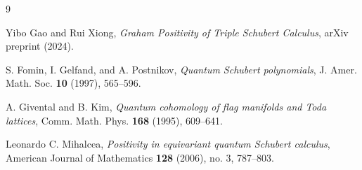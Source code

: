 \documentclass{amsart}
\theoremstyle{definition}
\begin{document}
\begin{thebibliography}{9}

Yibo Gao and Rui Xiong, \emph{Graham Positivity of Triple Schubert Calculus}, arXiv preprint (2024).

S. Fomin, I. Gelfand, and A. Postnikov, \emph{Quantum Schubert polynomials}, J. Amer. Math. Soc. \textbf{10} (1997), 565--596.

A. Givental and B. Kim, \emph{Quantum cohomology of flag manifolds and Toda lattices}, Comm. Math. Phys. \textbf{168} (1995), 609--641.

Leonardo C. Mihalcea, \emph{Positivity in equivariant quantum Schubert calculus}, American Journal of Mathematics \textbf{128} (2006), no. 3, 787--803.

\end{thebibliography}
\end{document}
